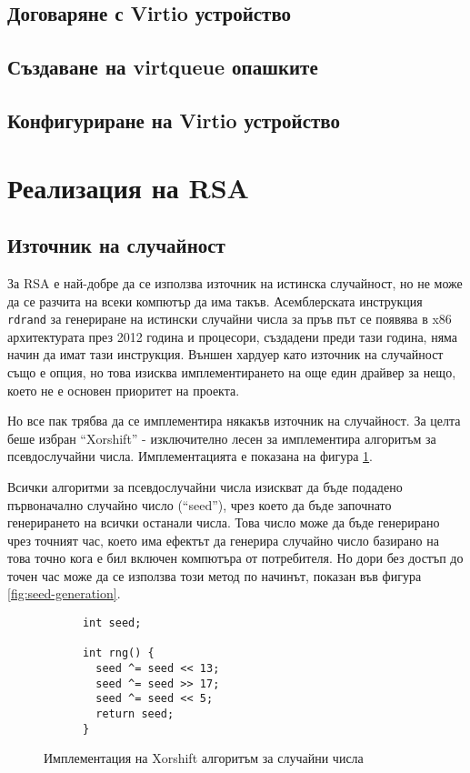   \subsection{Договаряне с Virtio устройство}

  \subsection{Създаване на virtqueue опашките}

  \subsection{Конфигуриране на Virtio устройство}

\section{Реализация на RSA}
  \subsection{Източник на случайност}
  За RSA е най-добре да се използва източник на истинска случайност, но не може да се разчита на всеки компютър да има такъв. Асемблерската инструкция {\tt rdrand} за генериране на истински случайни числа за пръв път се появява в x86 архитектурата през 2012 година и процесори, създадени преди тази година, няма начин да имат тази инструкция. Външен хардуер като източник на случайност също е опция, но това изисква имплементирането на още един драйвер за нещо, което не е основен приоритет на проекта.

  Но все пак трябва да се имплементира някакъв източник на случайност. За целта беше избран ``Xorshift'' - изключително лесен за имплементира алгоритъм за псевдослучайни числа. Имплементацията е показана на фигура \ref{fig:xorshift}.

  Всички алгоритми за псевдослучайни числа изискват да бъде подадено първоначално случайно число (``seed''), чрез което да бъде започнато генерирането на всички останали числа. Това число може да бъде генерирано чрез точният час, което има ефектът да генерира случайно число базирано на това точно кога е бил включен компютъра от потребителя. Но дори без достъп до точен час може да се използва този метод по начинът, показан във фигура \ref{fig:seed-generation}. %

  \begin{figure}[ht]
    \centering
    \caption{Имплементация на Xorshift алгоритъм за случайни числа}
    \begin{verbatim}
      int seed;

      int rng() {
        seed ^= seed << 13;
        seed ^= seed >> 17;
        seed ^= seed << 5;
        return seed;
      }
    \end{verbatim}
    \label{fig:xorshift}
  \end{figure}

